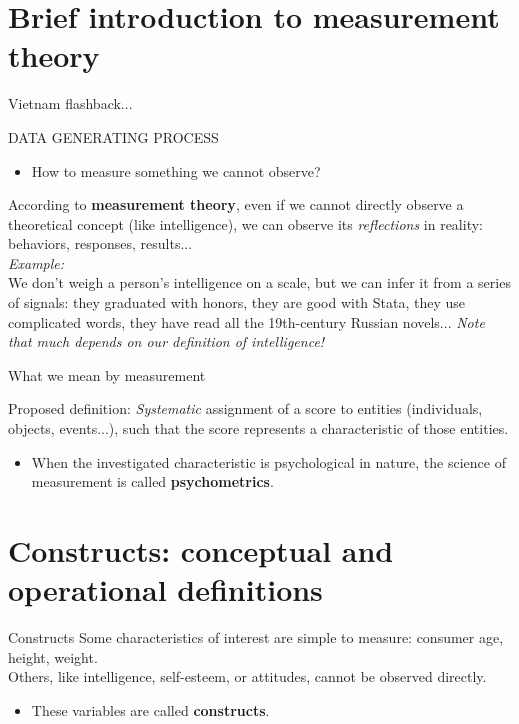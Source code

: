 \documentclass{beamer}
\begin{document}
\section{Brief introduction to measurement theory}
\begin{frame}{Vietnam flashback...}
\begin{center}
   {\huge \alert{DATA GENERATING PROCESS}} 
\end{center}
\vspace{0.5cm}
\begin{itemize}
    \item How to measure something we cannot observe?
\end{itemize}
\pause
\vspace{0.5cm}
According to \textbf{measurement theory}, even if we cannot directly observe a theoretical concept (like intelligence), we can observe its {\it reflections} in reality: behaviors, responses, results... \\
\vspace{0.5 cm}
\footnotesize
{\it Example:} \\
We don't weigh a person's intelligence on a scale, but we can infer it from a series of signals: they graduated with honors, they are good with Stata, they use complicated words, they have read all the 19th-century Russian novels... {\it Note that much depends on our definition of intelligence!}
\end{frame}

\begin{frame}{What we mean by measurement}
\begin{block}{Proposed definition:}
    \textit{Systematic} assignment of a score to entities (individuals, objects, events...), such that the score represents a characteristic of those entities.
\end{block}
\pause
\begin{itemize}
    \item When the investigated characteristic is psychological in nature, the science of measurement is called \textbf{psychometrics}.
\end{itemize}
\end{frame}

\section{Constructs: conceptual and operational definitions}
\begin{frame}{Constructs}
Some characteristics of interest are simple to measure: consumer age, height, weight. \\ Others, like intelligence, self-esteem, or attitudes, cannot be observed directly.
\begin{itemize}
    \item These variables are called \textbf{constructs}.
\end{itemize}
\end{frame}
\end{document}

